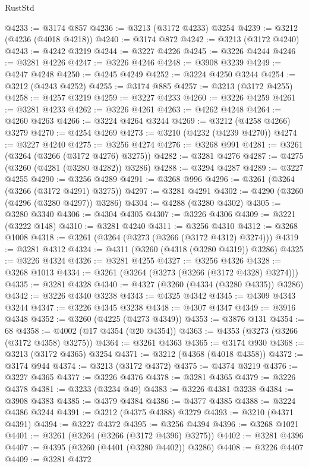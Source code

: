 \begin{lexlean}{RustStd}
\begin{coremodule}
@4233 := @3174 @857
@4236 := @3213 (@3172 @4233) @3254
@4239 := @3212 (@4236 (@4018 @4218))
@4240 := @3174 @872
@4242 := @3213 (@3172 @4240)
@4243 := @4242 @3219
@4244 := @3227 @4226
@4245 := @3226 @4244
@4246 := @3281 @4226
@4247 := @3226 @4246
@4248 := @3908 @3239
@4249 := @4247 @4248
@4250 := @4245 @4249
@4252 := @3224 @4250 @3244
@4254 := @3212 (@4243 @4252)
@4255 := @3174 @885
@4257 := @3213 (@3172 @4255)
@4258 := @4257 @3219
@4259 := @3227 @4233
@4260 := @3226 @4259
@4261 := @3281 @4233
@4262 := @3226 @4261
@4263 := @4262 @4248
@4264 := @4260 @4263
@4266 := @3224 @4264 @3244
@4269 := @3212 (@4258 @4266) @3279
@4270 := @4254 @4269
@4273 := @3210 (@4232 (@4239 @4270))
@4274 := @3227 @4240
@4275 := @3256 @4274
@4276 := @3268 @991
@4281 := @3261 (@3264 (@3266 (@3172 @4276) @3275))
@4282 := @3281 @4276
@4287 := @4275 (@3260 (@4281 (@3280 @4282)) @3286)
@4288 := @3294 @4287
@4289 := @3227 @4255
@4290 := @3256 @4289
@4291 := @3268 @996
@4296 := @3261 (@3264 (@3266 (@3172 @4291) @3275))
@4297 := @3281 @4291
@4302 := @4290 (@3260 (@4296 (@3280 @4297)) @3286)
@4304 := @4288 (@3280 @4302)
@4305 := @3280 @3340
@4306 := @4304 @4305
@4307 := @3226 @4306
@4309 := @3221 (@3222 @148)
@4310 := @3281 @4240
@4311 := @3256 @4310
@4312 := @3268 @1008
@4318 := @3261 (@3264 (@3273 (@3266 (@3172 @4312) @3274)))
@4319 := @3281 @4312
@4324 := @4311 (@3260 (@4318 (@3280 @4319)) @3286)
@4325 := @3226 @4324
@4326 := @3281 @4255
@4327 := @3256 @4326
@4328 := @3268 @1013
@4334 := @3261 (@3264 (@3273 (@3266 (@3172 @4328) @3274)))
@4335 := @3281 @4328
@4340 := @4327 (@3260 (@4334 (@3280 @4335)) @3286)
@4342 := @3226 @4340 @3238
@4343 := @4325 @4342
@4345 := @4309 @4343 @3244
@4347 := @3226 @4345 @3238
@4348 := @4307 @4347
@4349 := @3916 @4348
@4352 := @3260 (@4225 (@4273 @4349))
@4353 := @3876 @131
@4354 := 68
@4358 := @4002 (@17 @4354 (@20 @4354))
@4363 := @4353 (@3273 (@3266 (@3172 @4358) @3275))
@4364 := @3261 @4363
@4365 := @3174 @930
@4368 := @3213 (@3172 @4365) @3254
@4371 := @3212 (@4368 (@4018 @4358))
@4372 := @3174 @944
@4374 := @3213 (@3172 @4372)
@4375 := @4374 @3219
@4376 := @3227 @4365
@4377 := @3226 @4376
@4378 := @3281 @4365
@4379 := @3226 @4378
@4381 := @3233 (@3234 @49)
@4383 := @3226 @4381 @3238
@4384 := @3908 @4383
@4385 := @4379 @4384
@4386 := @4377 @4385
@4388 := @3224 @4386 @3244
@4391 := @3212 (@4375 @4388) @3279
@4393 := @3210 (@4371 @4391)
@4394 := @3227 @4372
@4395 := @3256 @4394
@4396 := @3268 @1021
@4401 := @3261 (@3264 (@3266 (@3172 @4396) @3275))
@4402 := @3281 @4396
@4407 := @4395 (@3260 (@4401 (@3280 @4402)) @3286)
@4408 := @3226 @4407
@4409 := @3281 @4372

\end{coremodule}
\end{lexlean}
